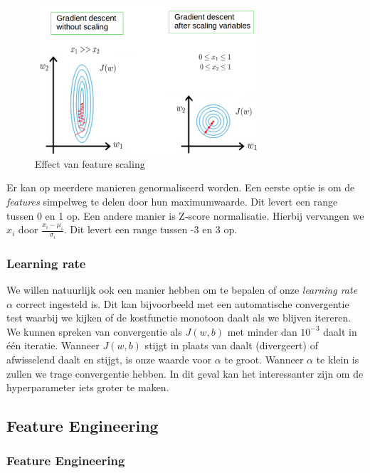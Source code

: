 \begin{figure}[h]
	\centering
	\includegraphics[width=0.75\textwidth]{images/8-feature-scaling.png}
	\caption{Effect van feature scaling}
	\label{fig:feature-scaling}
\end{figure}
\noindent
Er kan op meerdere manieren genormaliseerd worden. Een eerste optie is om de \textit{features} simpelweg te delen door hun maximumwaarde. Dit levert een range tussen 0 en 1 op. Een andere manier is Z-score normalisatie. Hierbij vervangen we $x_{i}$ door $\frac{x_{i} - \mu_{i}}{\sigma_{i}}$. Dit levert een range tussen -3 en 3 op. 

\subsubsection{Learning rate}

We willen natuurlijk ook een manier hebben om te bepalen of onze \textit{learning rate} $\alpha$ correct ingesteld is. Dit kan bijvoorbeeld met een automatische convergentie test waarbij we kijken of de kostfunctie monotoon daalt als we blijven itereren. We kunnen spreken van convergentie als $J(w,b)$ met minder dan $10^{-3}$ daalt in één iteratie. Wanneer $J(w,b)$ stijgt in plaats van daalt (divergeert) of afwisselend daalt en stijgt, is onze waarde voor $\alpha$ te groot. Wanneer $\alpha$ te klein is zullen we trage convergentie hebben. In dit geval kan het interessanter zijn om de hyperparameter iets groter te maken. 

\subsection{Feature Engineering}

\subsubsection{Feature Engineering}

